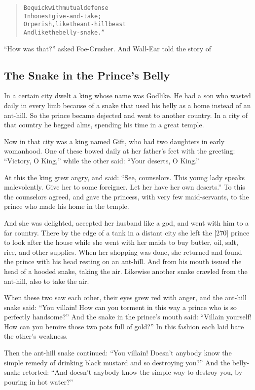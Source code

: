 \documentclass[article, twoside, 14pt]{memoir}
\renewenvironment{verbatim}{%
\begin{quote}%
\vskip -10pt%
\begin{alltt}\normalfont\large}{\end{alltt}%
\end{quote}%
\vskip -10pt
} %
\begin{document}
\begin{verbatim}
Be quick with mutual defense
    In honest give-and-take;
Or perish, like the ant-hill beast
    And like the belly-snake.”
\end{verbatim}
``How was that?'' asked Foe-Crusher. And Wall-Ear told the story
of

\subsection{The Snake in the Prince's Belly}

\label{s58}

In a certain city dwelt a king whose name was Godlike. He had a son
who wasted daily in every limb because of a snake that used his
belly as a home instead of an ant-hill. So the prince became
dejected and went to another country. In a city of that country he
begged alms, spending his time in a great temple.

Now in that city was a king named Gift, who had two daughters in
early womanhood. One of these bowed daily at her father's feet with
the greeting: ``Victory, O King,'' while the other said:
``Your deserts, O King.''

At this the king grew angry, and said:
``See, counselors. This young lady speaks malevolently. Give her to some foreigner. Let her have her own deserts.''
To this the counselors agreed, and gave the princess, with very few
maid-servants, to the prince who made his home in the temple.

And she was delighted, accepted her husband like a god, and went
with him to a far country. There by the edge of a tank in a distant
city she left the [270] prince to look after the house while she
went with her maids to buy butter, oil, salt, rice, and other
supplies. When her shopping was done, she returned and found the
prince with his head resting on an ant-hill. And from his mouth
issued the head of a hooded snake, taking the air. Likewise another
snake crawled from the ant-hill, also to take the air.

When these two saw each other, their eyes grew red with anger, and
the ant-hill snake said:
``You villain! How can you torment in this way a prince who is so perfectly handsome?''
And the snake in the prince's mouth said:
``Villain yourself! How can you bemire those two pots full of gold?''
In this fashion each laid bare the other's weakness.

Then the ant-hill snake continued:
``You villain! Doesn't anybody know the simple remedy of drinking black mustard and so destroying you?''
And the belly-snake retorted:
``And doesn't anybody know the simple way to destroy you, by pouring in hot water?''
\end{document}
